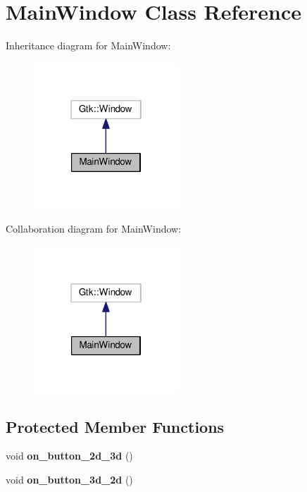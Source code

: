 \hypertarget{classMainWindow}{}\section{Main\+Window Class Reference}
\label{classMainWindow}


Inheritance diagram for Main\+Window\+:
\nopagebreak
\begin{figure}[H]
\begin{center}
\leavevmode
\includegraphics[width=154pt]{classMainWindow__inherit__graph}
\end{center}
\end{figure}


Collaboration diagram for Main\+Window\+:
\nopagebreak
\begin{figure}[H]
\begin{center}
\leavevmode
\includegraphics[width=154pt]{classMainWindow__coll__graph}
\end{center}
\end{figure}
\subsection*{Protected Member Functions}
\begin{DoxyCompactItemize}
\item 
void {\bfseries on\+\_\+button\+\_\+2d\+\_\+3d} ()\hypertarget{classMainWindow_a1259a864abd8c4397609e47fdfd57e91}{}\label{classMainWindow_a1259a864abd8c4397609e47fdfd57e91}

\item 
void {\bfseries on\+\_\+button\+\_\+3d\+\_\+2d} ()\hypertarget{classMainWindow_a50997436afe5e327ef6b8015767d4f59}{}\label{classMainWindow_a50997436afe5e327ef6b8015767d4f59}

\end{DoxyCompactItemize}
